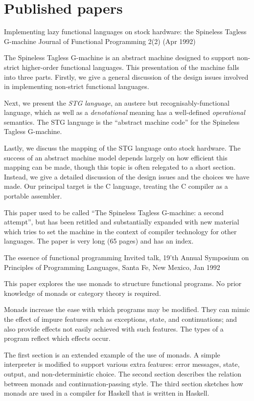 \section{Published papers}

{Implementing lazy functional languages on stock hardware: 
the Spineless Tagless G-machine}
{Journal of Functional Programming 2(2) (Apr 1992)}
{The Spineless Tagless G-machine is an abstract machine designed
to support non-strict higher-order 
functional languages.  This presentation of the machine
falls into three parts.  Firstly, we give a general discussion of
the design issues involved in implementing non-strict functional
languages.

Next, we present the {\em STG language},
an austere but recognisably-functional language, which as well as
a {\em denotational} meaning has a well-defined {\em operational} semantics.
The STG language is the ``abstract machine code'' for the Spineless
Tagless G-machine.

Lastly, we discuss the mapping of the STG language onto stock hardware.
The success of an abstract machine model depends largely on how efficient
this mapping can be made, though this topic is often relegated to a short
section.  Instead, we give a detailed discussion of the design issues and
the choices we have made.  Our principal target is the C language, treating
the C compiler as a portable assembler.

This paper used to be called ``The Spineless Tagless G-machine: a second
attempt'', but has been retitled and substantially expanded with new
material which tries to set the machine in the context of compiler
technology for other languages.  The paper is very long (65 pages) and
has an index.
}

{The essence of functional programming}
{Invited talk, 19'th Annual Symposium on Principles of
Programming Languages, Santa Fe, New Mexico, Jan 1992}
{
This paper explores the use monads to structure functional programs.
No prior knowledge of monads or category theory is required.

Monads increase the ease with which programs may be modified.  They can
mimic the effect of impure features such as exceptions, state, and
continuations; and also provide effects not easily achieved with such
features.  The types of a program reflect which effects occur.

The first section is an extended example of the use of monads.  A
simple interpreter is modified to support various extra features: error
messages, state, output, and non-deterministic choice.  The second
section describes the relation between monads and continuation-passing
style.  The third section sketches how monads are used in a compiler
for Haskell that is written in Haskell.
}

